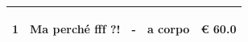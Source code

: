 \documentclass[a4paper]{article}
\begin{document}
\begin{tabular}{ | L{10mm} |  L{86mm} | L{12mm} | L{12mm} | L{16mm} | }
                              \vspace{2.5mm}
                              \begin{spacing}{0}
                           1
                              \end{spacing} &
                              \vspace{2.5mm}
                              \begin{spacing}{0}
                           Ma perch\'e fff ?!
                              \end{spacing} &
                              \vspace{2.5mm}
                              \begin{spacing}{0}
                           -
                              \end{spacing} &
                              \vspace{2.5mm}
                              \begin{spacing}{0}
                           a corpo
                              \end{spacing} &
                              \vspace{2.5mm}
                              \begin{spacing}{0}
                                \euro\hfill 
                            60.0
                              \end{spacing} \\
                              \hline
            

\end{tabular}
\end{document}
